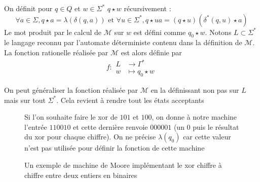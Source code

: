 \documentclass{scrartcl}
\begin{document}
\begin{flushleft}
\begin{define}
    On définit pour $q \in Q$ et $w \in \Sigma^*$ $q \star w$ récursivement :
    \[ \forall a \in \Sigma, q \star a = \lambda(\delta(q, a)) \text{ et } \forall u \in \Sigma^*,
    q \star ua = (q \star u)(\delta^*(q, u) \star a) \]
    Le mot produit par le calcul de $\mathcal{M}$ sur $w$ est défini comme $q_0 \star w$. Notons $L \subset \Sigma^*$
    le langage reconnu par l'automate déterministe contenu dans la définition de $\mathcal{M}$. La fonction rationelle
    réalisée par $\mathcal{M}$ est alors définie par
    \[ f : \begin{array}{cl}
        L &\longrightarrow \Gamma^*\\
        w &\longmapsto q_0 \star w
    \end{array} \]
\end{define}

On peut généraliser la fonction réalisée par $\mathcal{M}$ en la définissant non pas sur $L$ mais sur tout
$\Sigma^*$. Cela revient à rendre tout les états acceptants

\begin{figure}[h]
    \caption{Un exemple de machine de Moore implémentant le xor chiffre à chiffre entre deux entiers en binaires}
    \begin{center}
        Si l'on souhaite faire le xor de $101$ et $100$, on donne à notre machine l'entrée
        $110010$ et cette dernière renvoie $000001$ (un 0 puis le résultat du xor pour chaque chiffre).
        On ne précise $\lambda(q_0)$ car cette valeur n'est pas utilisée pour définir la fonction de cette machine\\
        \vspace*{0.5cm}
    \end{center}
\end{figure}


\end{flushleft}
\end{document}
